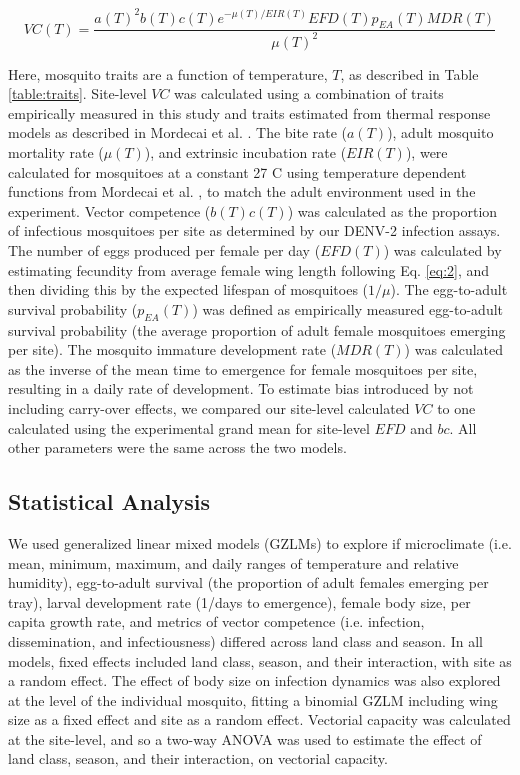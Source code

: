 \documentclass[12pt]{article}
\begin{document}
\begin{equation} \label{eq:3}
VC(T) =\frac{a(T)^2b(T)c(T)e^{-\mu (T)/EIR(T)} EFD(T) p_{EA}(T) MDR(T)} {\mu(T)^2}
\end{equation}

Here, mosquito traits are a function of temperature, $T$, as described in Table \ref{table:traits}.
Site-level $VC$ was calculated using a combination of traits empirically measured in this study and traits estimated from thermal response models as described in Mordecai et al. \cite{mordecai2017}.
The bite rate ($a(T)$), adult mosquito mortality rate ($\mu(T)$), and extrinsic incubation rate ($EIR(T)$), were calculated for mosquitoes at a constant 27 \degree C using temperature dependent functions from Mordecai et al. \cite{mordecai2017}, to match the adult environment used in the experiment.
Vector competence ($b(T)c(T)$) was calculated as the proportion of infectious mosquitoes per site as determined by our DENV-2 infection assays.
The number of eggs produced per female per day ($EFD(T)$) was calculated by estimating fecundity from average female wing length following Eq. \ref{eq:2}, and then dividing this by the expected lifespan of mosquitoes ($1/\mu$).
The egg-to-adult survival probability ($p_{EA}(T)$) was defined as empirically measured egg-to-adult survival probability (the average proportion of adult female mosquitoes emerging per site).
The mosquito immature development rate ($MDR(T)$) was calculated as the inverse of the mean time to emergence for female mosquitoes per site, resulting in a daily rate of development.
To estimate bias introduced by not including carry-over effects, we compared our site-level calculated $VC$ to one calculated using the experimental grand mean for site-level $EFD$ and $bc$.
All other parameters were the same across the two models.

\subsection*{Statistical Analysis}

We used generalized linear mixed models (GZLMs) to explore if microclimate (i.e. mean, minimum, maximum, and daily ranges of temperature and relative humidity), egg-to-adult survival (the proportion of adult females emerging per tray), larval development rate (1/days to emergence), female body size, per capita growth rate, and metrics of vector competence (i.e. infection, dissemination, and infectiousness) differed across land class and season.
In all models, fixed effects included land class, season, and their interaction, with site as a random effect.
The effect of body size on infection dynamics was also explored at the level of the individual mosquito, fitting a binomial GZLM including wing size as a fixed effect and site as a random effect.
Vectorial capacity was calculated at the site-level, and so a two-way ANOVA was used to estimate the effect of land class, season, and their interaction, on vectorial capacity.
\end{document}
